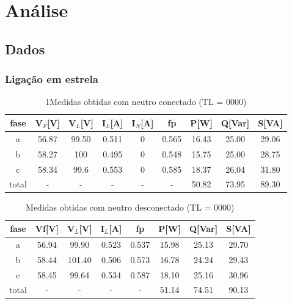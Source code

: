 \documentclass[a4paper, 12pt]{article}
\begin{document}
\newpage
\section{Análise}
    \justifying
    \subsection{Dados}
        \subsubsection{Ligação em estrela}
        \justifying
            \begin{table}[H]
         \centering
        \begin{tabular}{|c|c|c|c|c|c|c|c|c|}
              \hline %
                  fase & V\(_F\)[V] & V\(_L\)[V] & I\(_L\)[A] & I\(_N\)[A] & fp & P[W] & Q[Var] & S[VA] \\
              \hline %
           a & 56.87 & 99.50 & 0.511 & 0 & 0.565 & 16.43 & 25.00 & 29.06     \\ 
              \hline %
           b & 58.27 & 100 & 0.495 & 0 & 0.548 & 15.75 & 25.00 & 28.75     \\ 
              \hline %
           c & 58.34 & 99.6 & 0.553 & 0 & 0.585 & 18.37 & 26.04 & 31.80     \\ 
              \hline %
           total & - & - & - & - & - & 50.82 & 73.95 & 89.30     \\ 
              \hline %
        \end{tabular}
        \caption{1Medidas obtidas com neutro conectado (TL = 0000) }
        \end{table}
        
        \begin{table}[H]
             \centering
            \begin{tabular}{|c|c|c|c|c|c|c|c|}
                  \hline %
                      fase & Vf[V] & V\(_L\)[V] & I\(_L\)[A] & fp & P[W] & Q[Var] & S[VA] \\
                  \hline %
               a & 56.94 & 99.90 & 0.523 & 0.537 & 15.98 & 25.13 & 29.70     \\ 
                  \hline %
               b & 58.44 & 101.40 & 0.506 & 0.573 & 16.78 & 24.24 & 29.43     \\ 
                  \hline %
               c & 58.45 & 99.64 & 0.534 & 0.587 & 18.10 & 25.16 & 30.96     \\ 
                  \hline %
               total & - & - & - & - & 51.14 & 74.51 & 90.13     \\ 
                  \hline %
            \end{tabular}
            \caption{Medidas obtidas com neutro desconectado (TL = 0000)}
        \end{table}
\end{document}
